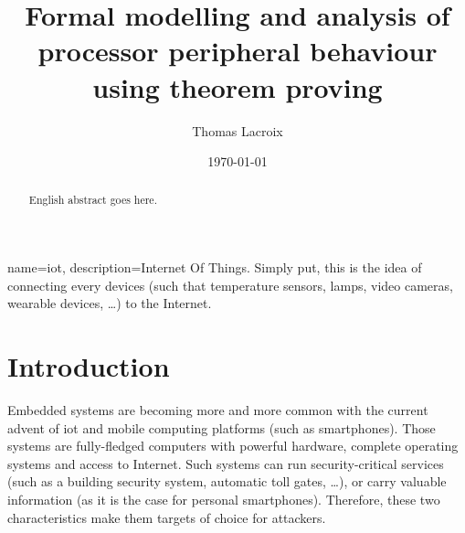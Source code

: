 \documentclass{kththesis}
\title{Formal modelling and analysis of processor peripheral behaviour using theorem proving}
\author{Thomas Lacroix}
\date{\today}
\begin{document}
\frontmatter %

\titlepage

\begin{abstract}
  English abstract goes here.
\end{abstract}


\tableofcontents

\mainmatter %



{
    name=iot,
    description={Internet Of Things. Simply put, this is the idea of connecting every devices (such that temperature sensors, lamps, video cameras, wearable devices, \dots) to the Internet.}
}

\printglossaries

\chapter{Introduction}

Embedded systems are becoming more and more common with the current advent of \Gls{iot} and mobile computing platforms (such as smartphones). Those systems are fully-fledged computers with powerful hardware, complete operating systems and access to Internet. Such systems can run security-critical services (such as a building security system, automatic toll gates, \dots), or carry valuable information (as it is the case for personal smartphones). Therefore, these two characteristics make them targets of choice for attackers.
\end{document}
